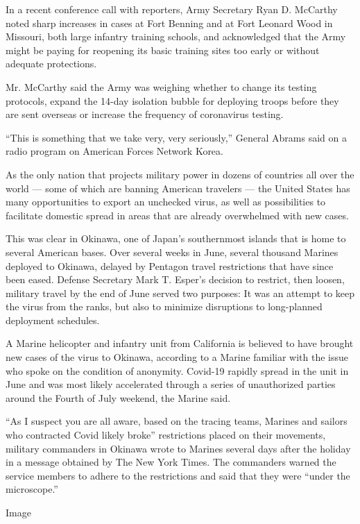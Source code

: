 In a recent conference call with reporters, Army Secretary Ryan D.
McCarthy noted sharp increases in cases at Fort Benning and at Fort
Leonard Wood in Missouri, both large infantry training schools, and
acknowledged that the Army might be paying for reopening its basic
training sites too early or without adequate protections.

Mr. McCarthy said the Army was weighing whether to change its testing
protocols, expand the 14-day isolation bubble for deploying troops
before they are sent overseas or increase the frequency of coronavirus
testing.

``This is something that we take very, very seriously,'' General Abrams
said on a radio program on American Forces Network Korea.

As the only nation that projects military power in dozens of countries
all over the world --- some of which are banning American travelers ---
the United States has many opportunities to export an unchecked virus,
as well as possibilities to facilitate domestic spread in areas that are
already overwhelmed with new cases.

This was clear in Okinawa, one of Japan's southernmost islands that is
home to several American bases. Over several weeks in June, several
thousand Marines deployed to Okinawa, delayed by Pentagon travel
restrictions that have since been eased. Defense Secretary Mark T.
Esper's decision to restrict, then loosen, military travel by the end of
June served two purposes: It was an attempt to keep the virus from the
ranks, but also to minimize disruptions to long-planned deployment
schedules.

A Marine helicopter and infantry unit from California is believed to
have brought new cases of the virus to Okinawa, according to a Marine
familiar with the issue who spoke on the condition of anonymity.
Covid-19 rapidly spread in the unit in June and was most likely
accelerated through a series of unauthorized parties around the Fourth
of July weekend, the Marine said.

``As I suspect you are all aware, based on the tracing teams, Marines
and sailors who contracted Covid likely broke'' restrictions placed on
their movements, military commanders in Okinawa wrote to Marines several
days after the holiday in a message obtained by The New York Times. The
commanders warned the service members to adhere to the restrictions and
said that they were ``under the microscope.''

Image

